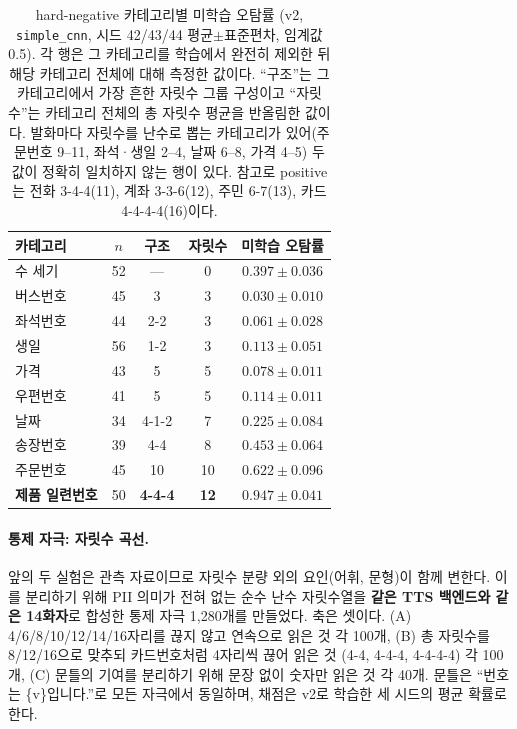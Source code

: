 \documentclass[10pt,twocolumn]{article}
\renewcommand{\emph}[1]{\textbf{#1}}
\begin{document}
\begin{table}[!t]
\centering
\caption{hard-negative 카테고리별 미학습 오탐률 (v2, \texttt{simple\_cnn}, 시드 42/43/44
평균$\pm$표준편차, 임계값 0.5). 각 행은 그 카테고리를 학습에서 완전히 제외한 뒤 해당 카테고리
전체에 대해 측정한 값이다. ``구조''는 그 카테고리에서 가장 흔한 자릿수 그룹 구성이고 ``자릿수''는 카테고리 전체의 총
자릿수 평균을 반올림한 값이다. 발화마다 자릿수를 난수로 뽑는 카테고리가 있어(주문번호 9--11,
좌석·생일 2--4, 날짜 6--8, 가격 4--5) 두 값이 정확히 일치하지 않는 행이 있다. 참고로 positive는
전화 3-4-4(11), 계좌 3-3-6(12), 주민 6-7(13), 카드 4-4-4-4(16)이다.}
\label{tab:heldcat}
\footnotesize
\setlength{\tabcolsep}{4.5pt}
\begin{tabular}{lcccc}
\toprule
카테고리 & $n$ & 구조 & 자릿수 & 미학습 오탐률 \\
\midrule
수 세기      & 52 & ---    & 0  & $0.397\pm0.036$ \\
버스번호     & 45 & 3      & 3  & $0.030\pm0.010$ \\
좌석번호     & 44 & 2-2    & 3  & $0.061\pm0.028$ \\
생일         & 56 & 1-2    & 3  & $0.113\pm0.051$ \\
가격         & 43 & 5      & 5  & $0.078\pm0.011$ \\
우편번호     & 41 & 5      & 5  & $0.114\pm0.011$ \\
날짜         & 34 & 4-1-2  & 7  & $0.225\pm0.084$ \\
송장번호     & 39 & 4-4    & 8  & $0.453\pm0.064$ \\
주문번호     & 45 & 10     & 10 & $0.622\pm0.096$ \\
\textbf{제품 일련번호} & 50 & \textbf{4-4-4} & \textbf{12} & $\mathbf{0.947\pm0.041}$ \\
\bottomrule
\end{tabular}
\end{table}

\paragraph{통제 자극: 자릿수 곡선.}
앞의 두 실험은 관측 자료이므로 자릿수 분량 외의 요인(어휘, 문형)이 함께 변한다. 이를 분리하기
위해 PII 의미가 전혀 없는 순수 난수 자릿수열을 \emph{같은 TTS 백엔드와 같은 14화자}로 합성한
통제 자극 1{,}280개를 만들었다. 축은 셋이다. (A) 4/6/8/10/12/14/16자리를 끊지 않고 연속으로
읽은 것 각 100개, (B) 총 자릿수를 8/12/16으로 맞추되 카드번호처럼 4자리씩 끊어 읽은 것
(4-4, 4-4-4, 4-4-4-4) 각 100개, (C) 문틀의 기여를 분리하기 위해 문장 없이 숫자만 읽은 것 각
40개. 문틀은 ``번호는 \{v\}입니다.''로 모든 자극에서 동일하며, 채점은 v2로 학습한 세 시드의
평균 확률로 한다.
\end{document}
